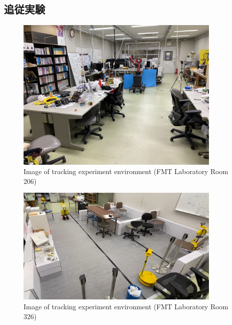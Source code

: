 \subsection{追従実験}
\begin{figure}[h]
  \begin{center}
  \includegraphics[width=100mm,clip]{figure/experimental_env1.JPG}
  \caption{Image of tracking experiment environment (FMT Laboratory Room 206)}
  \label{Image of tracking experiment environment (FMT Laboratory Room 206)}
  \end{center}
\end{figure}

\begin{figure}[h]
  \begin{center}
  \includegraphics[width=100mm,clip]{figure/experimental_env2.png}
  \caption{Image of tracking experiment environment (FMT Laboratory Room 326)}
  \label{Image of tracking experiment environment (FMT Laboratory Room 326)}
  \end{center}
\end{figure}

